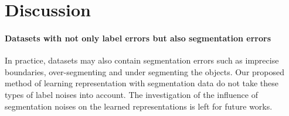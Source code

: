 \section{Discussion}
\label{sec:discussion}





%



\paragraph{Datasets with not only label errors but also segmentation errors}
In practice, datasets may also contain segmentation errors such as imprecise boundaries, over-segmenting and under segmenting the objects.
Our proposed method of learning representation with segmentation data do not take these types of label noises into account.
The investigation of the influence of segmentation noises on the learned representations is left for future works.



